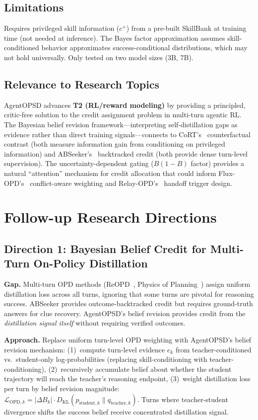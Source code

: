 \documentclass[11pt,a4paper]{article}
\begin{document}
\subsection{Limitations}
Requires privileged skill information ($c^+$) from a pre-built SkillBank at training time (not needed at inference). The Bayes factor approximation assumes skill-conditioned behavior approximates success-conditional distributions, which may not hold universally. Only tested on two model sizes (3B, 7B).

\subsection{Relevance to Research Topics}
AgentOPSD advances \textbf{T2 (RL/reward modeling)} by providing a principled, critic-free solution to the credit assignment problem in multi-turn agentic RL. The Bayesian belief revision framework---interpreting self-distillation gaps as evidence rather than direct training signals---connects to CoRT's~\cite{cort2026} counterfactual contrast (both measure information gain from conditioning on privileged information) and ABSeeker's~\cite{abseeker2026} backtracked credit (both provide dense turn-level supervision). The uncertainty-dependent gating ($B(1-B)$ factor) provides a natural ``attention'' mechanism for credit allocation that could inform Flux-OPD's~\cite{fluxopd2026} conflict-aware weighting and Relay-OPD's~\cite{relayopd2026} handoff trigger design.

\section{Follow-up Research Directions}

\subsection{Direction 1: Bayesian Belief Credit for Multi-Turn On-Policy Distillation}

\textbf{Gap.} Multi-turn OPD methods (ReOPD~\cite{reopd2026}, Physics of Planning~\cite{physicsplanning2026}) assign uniform distillation loss across all turns, ignoring that some turns are pivotal for reasoning success. ABSeeker provides outcome-backtracked credit but requires ground-truth answers for clue recovery. AgentOPSD's belief revision provides credit from the \emph{distillation signal itself} without requiring verified outcomes.

\textbf{Approach.} Replace uniform turn-level OPD weighting with AgentOPSD's belief revision mechanism: (1)~compute turn-level evidence $e_k$ from teacher-conditioned vs.\ student-only log-probabilities (replacing skill-conditioning with teacher-conditioning), (2)~recursively accumulate belief about whether the student trajectory will reach the teacher's reasoning endpoint, (3)~weight distillation loss per turn by belief revision magnitude: $\mathcal{L}_{\text{OPD},k} = |\Delta B_k| \cdot D_{\text{KL}}(p_{\text{student},k} \| q_{\text{teacher},k})$. Turns where teacher-student divergence shifts the success belief receive concentrated distillation signal.
\end{document}
